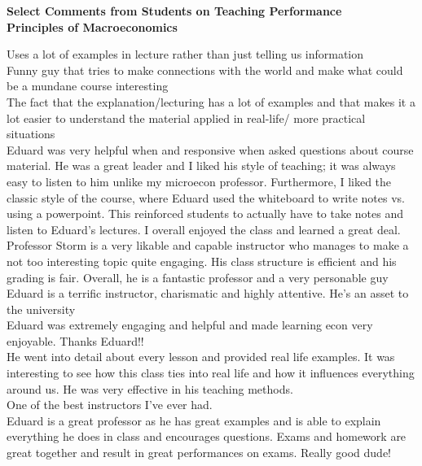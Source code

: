 \documentclass[a4paper,11pt]{article}
\begin{document}
\textbf{\large{Select Comments from Students on Teaching Performance}}\\

\textbf{Principles of Macroeconomics}

Uses a lot of examples in lecture rather than just telling us information \\

Funny guy that tries to make connections with the world and make what could be a mundane course interesting \\

The fact that the explanation/lecturing has a lot of examples and that makes it a lot easier to understand the material applied in real-life/ more practical situations \\

Eduard was very helpful when and responsive when asked questions about course material. He was a great leader and I liked his style of teaching; it was always easy to listen to him unlike my microecon professor. Furthermore, I liked the classic style of the course, where Eduard used the whiteboard
to write notes vs. using a powerpoint. This reinforced students to actually have to take notes and listen to Eduard's lectures. I overall enjoyed the class and learned a great deal. \\

Professor Storm is a very likable and capable instructor who manages to make a not too interesting topic quite engaging. His class structure is efficient and his grading is fair. Overall, he is a fantastic professor and a very personable guy \\

Eduard is a terrific instructor, charismatic and highly attentive. He's an asset to the university \\

Eduard was extremely engaging and helpful and made learning econ very enjoyable. Thanks Eduard!! \\

He went into detail about every lesson and provided real life examples. It was interesting to see how this class ties into real life and how it influences everything around us. He was very effective in his teaching methods. \\

One of the best instructors I've ever had. \\

Eduard is a great professor as he has great examples and is able to explain everything he does in class and encourages questions. Exams and homework are great together and result in great performances on exams. Really good dude! \\
\end{document}
